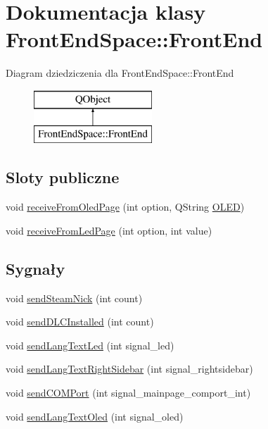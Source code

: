 \hypertarget{class_front_end_space_1_1_front_end}{}\section{Dokumentacja klasy Front\+End\+Space\+:\+:Front\+End}
\label{class_front_end_space_1_1_front_end}
Diagram dziedziczenia dla Front\+End\+Space\+:\+:Front\+End\begin{figure}[H]
\begin{center}
\leavevmode
\includegraphics[height=2.000000cm]{class_front_end_space_1_1_front_end}
\end{center}
\end{figure}
\subsection*{Sloty publiczne}
\begin{DoxyCompactItemize}
\item 
void \hyperlink{class_front_end_space_1_1_front_end_a471196c0419065d1969e1e64b06e2cfe}{receive\+From\+Oled\+Page} (int option, Q\+String \hyperlink{class_o_l_e_d}{O\+L\+ED})
\item 
void \hyperlink{class_front_end_space_1_1_front_end_aa0d0691268086bcbd37570cc3c4c0be3}{receive\+From\+Led\+Page} (int option, int value)
\end{DoxyCompactItemize}
\subsection*{Sygnały}
\begin{DoxyCompactItemize}
\item 
void \hyperlink{class_front_end_space_1_1_front_end_a4e5b30b73f05767648e40d7a6975309b}{send\+Steam\+Nick} (int count)
\item 
void \hyperlink{class_front_end_space_1_1_front_end_ad9fc5527da64900461e6eb2fa1328824}{send\+D\+L\+C\+Installed} (int count)
\item 
void \hyperlink{class_front_end_space_1_1_front_end_a14f87e260a6124690b950b8f5c5386bb}{send\+Lang\+Text\+Led} (int signal\+\_\+led)
\item 
void \hyperlink{class_front_end_space_1_1_front_end_a62105794115a8df067985de358570358}{send\+Lang\+Text\+Right\+Sidebar} (int signal\+\_\+rightsidebar)
\item 
void \hyperlink{class_front_end_space_1_1_front_end_ab3f7bd7a1edbf77329068f95edef900e}{send\+C\+O\+M\+Port} (int signal\+\_\+mainpage\+\_\+comport\+\_\+int)
\item 
void \hyperlink{class_front_end_space_1_1_front_end_a9d0313700deb9def1493a4705dc70ea3}{send\+Lang\+Text\+Oled} (int signal\+\_\+oled)
\end{DoxyCompactItemize}
